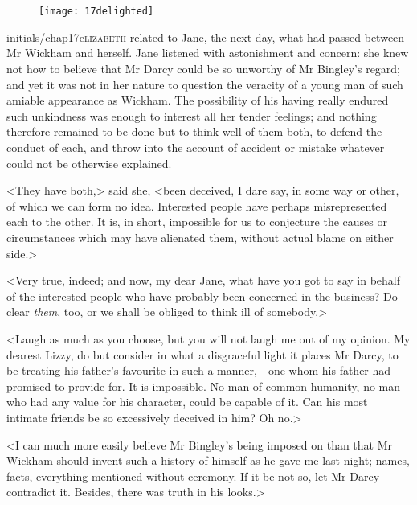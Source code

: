 \chapter[Chapter \thechapter]{}
	
\begin{figure}[t!]
	\centering
\texttt{[image: 17delighted]}
\end{figure}	
	
\lettrine[lines=6,image=true]{initials/chap17e}{lizabeth}  related to Jane, the next day, what had passed between Mr Wickham and herself. Jane listened with astonishment and concern: she knew not how to believe that Mr Darcy could be so unworthy of Mr Bingley's regard; and yet it was not in her nature to question the veracity of a young man of such amiable appearance as Wickham. The possibility of his having really endured such unkindness was enough to interest all her tender feelings; and nothing therefore remained to be done but to think well of them both, to defend the conduct of each, and throw into the account of accident or mistake whatever could not be otherwise explained.

<They have both,> said she, <been deceived, I dare say, in some way or other, of which we can form no idea. Interested people have perhaps misrepresented each to the other. It is, in short, impossible for us to conjecture the causes or circumstances which may have alienated them, without actual blame on either side.>

<Very true, indeed; and now, my dear Jane, what have you got to say in behalf of the interested people who have probably been concerned in the business? Do clear \textit{them}, too, or we shall be obliged to think ill of somebody.>

<Laugh as much as you choose, but you will not laugh me out of my opinion. My dearest Lizzy, do but consider in what a disgraceful light it places Mr Darcy, to be treating his father's favourite in such a manner,—one whom his father had promised to provide for. It is impossible. No man of common humanity, no man who had any value for his character, could be capable of it. Can his most intimate friends be so excessively deceived in him? Oh no.>

<I can much more easily believe Mr Bingley's being imposed on than that Mr Wickham should invent such a history of himself as he gave me last night; names, facts, everything mentioned without ceremony. If it be not so, let Mr Darcy contradict it. Besides, there was truth in his looks.>

